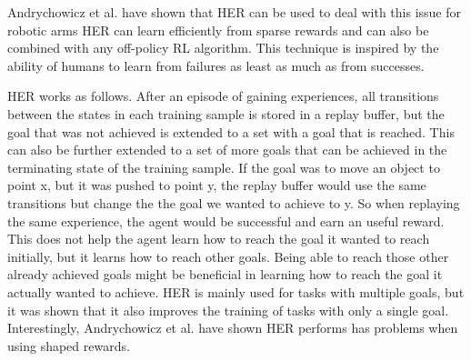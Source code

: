 \vspace{0.5cm}
 
Andrychowicz et al. have shown that HER can be used to deal with this issue for robotic arms \cite{herpaper}
HER can learn efficiently from sparse rewards and can also be combined with any off-policy RL algorithm.
This technique is inspired by the ability of humans to learn from failures as least as much as from successes.

\vspace{0.5cm}

HER works as follows. After an episode of gaining experiences, all transitions between the states in each training sample is stored in a replay buffer, but the goal that was not achieved is extended to a set with a goal that is reached. This can also be further extended to a set of more goals that can be achieved in the terminating state of the training sample. If the goal was to move an object to point x, but it was pushed to point y, the replay buffer would use the same transitions but change the the goal we wanted to achieve to y. So when replaying the same experience, the agent would be successful and earn an useful reward. This does not help the agent learn how to reach the goal it wanted to reach initially, but it learns how to reach other goals. Being able to reach those other already achieved goals might be beneficial in learning how to reach the goal it actually wanted to achieve. HER is mainly used for tasks with multiple goals, but it was shown that it also improves the training of tasks with only a single goal. \cite{herpaper}
Interestingly, Andrychowicz et al. have shown HER performs has problems when using shaped rewards. \cite{herpaper}
 
